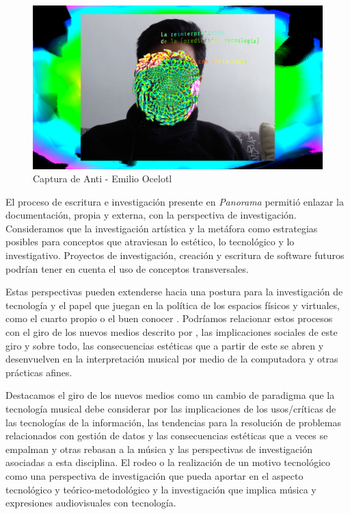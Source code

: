\begin{figure}
  \includegraphics[width=\textwidth]{img/antiHydra2.png}
  \caption{Captura de Anti - Emilio Ocelotl}
  \label{fig:anti}
\end{figure}
El proceso de escritura e investigación presente en \textit{Panorama} permitió enlazar la documentación, propia y externa, con la perspectiva de investigación. Consideramos que la investigación artística y la metáfora como estrategias posibles para conceptos que atraviesan lo estético, lo tecnológico y lo investigativo. Proyectos de investigación, creación y escritura de software futuros podrían tener en cuenta el uso de conceptos transversales. 

Estas perspectivas pueden extenderse hacia una postura para la investigación de tecnología y el papel que juegan en la política de los espacios físicos y virtuales, como el cuarto propio \citep{cuartopropio} o el buen conocer \citep{plato}. Podríamos relacionar estos procesos con el giro de los nuevos medios descrito por \cite{manovichlanguage}, las implicaciones sociales de este giro y sobre todo, las consecuencias estéticas que a partir de este se abren y desenvuelven en la interpretación musical por medio de la computadora y otras prácticas afines. 

Destacamos el giro de los nuevos medios como un cambio de paradigma que la tecnología musical debe considerar por las implicaciones de los usos/críticas de las tecnologías de la información, las tendencias para la resolución de problemas relacionados con gestión de datos y las consecuencias estéticas que a veces se empalman y otras rebasan a la música y las perspectivas de investigación asociadas a esta disciplina. El rodeo o la realización de un motivo tecnológico como una perspectiva de investigación que pueda aportar en el aspecto tecnológico y teórico-metodológico y la investigación que implica música y expresiones audiovisuales con tecnología.

